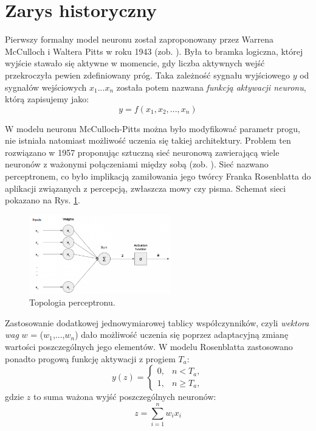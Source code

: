 \section{Zarys historyczny}

Pierwszy formalny model neuronu został zaproponowany przez Warrena McCulloch i Waltera Pitts w roku 1943 (zob. \cite{McCulloch1943}). Była to bramka logiczna, której wyjście stawało się aktywne w momencie, gdy liczba aktywnych wejść przekroczyła pewien zdefiniowany próg. Taka zależność sygnału wyjściowego $y$ od sygnałów wejściowych $x_1$...$x_n$ została potem nazwana \textit{funkcją aktywacji neuronu}, którą zapisujemy jako:
\begin{equation}
\label{eqActFunc}
y=f\left(x_1, x_2,..., x_n\right)
\end{equation}

W modelu neuronu McCulloch-Pitts można było modyfikować parametr progu, nie istniała natomiast możliwość uczenia się takiej architektury. Problem ten rozwiązano w 1957 proponując sztuczną sieć neuronową zawierającą wiele neuronów z ważonymi połączeniami między sobą (zob. \cite{Rosenblatt1957}). Sieć nazwano perceptronem, co było implikacją zamiłowania jego twórcy Franka Rosenblatta do aplikacji związanych z percepcją, zwłaszcza mowy czy pisma. Schemat sieci pokazano na Rys. \ref{Perceptron}.
\begin{figure}[h!]
	\centering
	\includegraphics[width=0.55\textwidth]{figures/perceptron.png}
	\caption{Topologia perceptronu.}
	\label{Perceptron}
\end{figure}

Zastosowanie dodatkowej jednowymiarowej tablicy współczynników, czyli \textit{wektora wag} $w$ = ($w_1$,...,$w_n$) dało możliwość uczenia się poprzez adaptacyjną zmianę wartości poszczególnych jego elementów. W modelu Rosenblatta zastosowano ponadto progową funkcję aktywacji z progiem $T_a$:
\begin{equation}
y(z)=\begin{cases} 0, & n < T_a, \\ 1, & n \ge T_a, \end{cases}
\end{equation}
gdzie $z$ to suma ważona wyjść poszczególnych neuronów:
\begin{equation}
\label{eqLinActFunc}
z=\sum_{i=1}^{n}w_i x_i
\end{equation}

